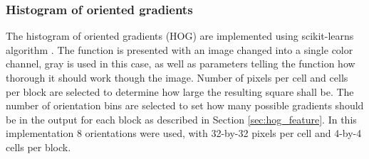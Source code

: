 \subsubsection{Histogram of oriented gradients}
\label{sec:meth:featextr:hog}

The histogram of oriented gradients (HOG) are implemented using scikit-learns algorithm \cite{scikitlearn}. The function is presented with an image changed into a single color channel, gray is used in this case, as well as parameters telling the function how thorough it should work though the image. Number of pixels per cell and cells per block are selected to determine how large the resulting square shall be. The number of orientation bins are selected to set how many possible gradients should be in the output for each block as described in Section \ref{sec:hog_feature}. In this implementation 8 orientations were used, with 32-by-32 pixels per cell and 4-by-4 cells per block. 